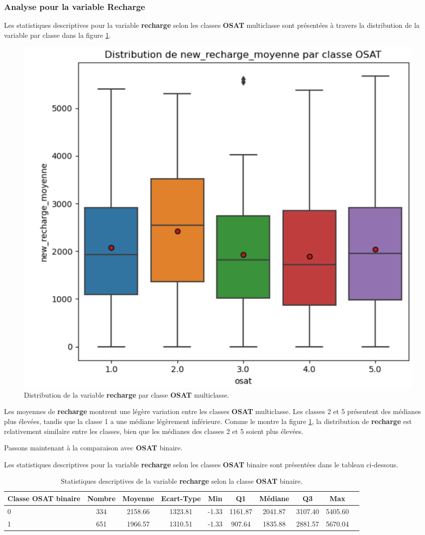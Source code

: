 \subsubsection*{Analyse pour la variable Recharge}
Les statistiques descriptives pour la variable \textbf{recharge} selon les classes \textbf{OSAT} multiclasse sont présentées à travers la distribution de la variable par classe dans la figure \ref{fig:analyse_descriptive_2}.

\begin{figure}[H]
    \centering
    \includegraphics[width=0.7\linewidth]{analyse_descriptive_2.png}
    \caption{Distribution de la variable \textbf{recharge} par classe \textbf{OSAT} multiclasse.}
    \label{fig:analyse_descriptive_2}
\end{figure}

Les moyennes de \textbf{recharge} montrent une légère variation entre les classes \textbf{OSAT} multiclasse. Les classes 2 et 5 présentent des médianes plus élevées, tandis que la classe 1 a une médiane légèrement inférieure. Comme le montre la figure \ref{fig:analyse_descriptive_2}, la distribution de \textbf{recharge} est relativement similaire entre les classes, bien que les médianes des classes 2 et 5 soient plus élevées.

Passons maintenant à la comparaison avec \textbf{OSAT} binaire.

Les statistiques descriptives pour la variable \textbf{recharge} selon les classes \textbf{OSAT} binaire sont présentées dans le tableau ci-dessous.

\begin{table}[H]
    \centering
    \begin{tabular}{lccccccccc} %
        \toprule
        Classe OSAT binaire & Nombre & Moyenne & Ecart-Type & Min & Q1 & Médiane & Q3 & Max \\
        \midrule
        0 & 334 & 2158.66 & 1323.81 & -1.33 & 1161.87 & 2041.87 & 3107.40 & 5405.60 \\
        1 & 651 & 1966.57 & 1310.51 & -1.33 & 907.64 & 1835.88 & 2881.57 & 5670.04 \\
        \bottomrule
    \end{tabular}
    \caption{Statistiques descriptives de la variable \textbf{recharge} selon la classe \textbf{OSAT} binaire.}
\end{table}

